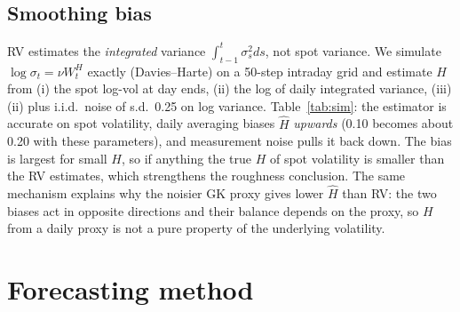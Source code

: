 \documentclass[11pt,a4paper]{article}
\begin{document}
\begin{table}[h]
\centering\footnotesize
\begin{minipage}{0.42\textwidth}\centering

\label{tab:gauss}
\end{minipage}\hfill
\begin{minipage}{0.55\textwidth}\centering

\label{tab:sim}
\end{minipage}
\end{table}

\subsection{Smoothing bias}
RV estimates the \emph{integrated} variance $\int_{t-1}^t\sigma_s^2ds$, not spot variance. We simulate
$\log\sigma_t=\nu W^H_t$ exactly (Davies--Harte) on a 50-step intraday grid and estimate $H$ from (i) the spot
log-vol at day ends, (ii) the log of daily integrated variance, (iii) (ii) plus i.i.d.\ noise of s.d.\ 0.25
on log variance. Table~\ref{tab:sim}: the estimator is accurate on spot volatility, daily averaging
biases $\hat H$ \emph{upwards} (0.10 becomes about 0.20 with these parameters), and measurement noise
pulls it back down. The bias is largest for small $H$, so if anything the true $H$ of spot volatility is
smaller than the RV estimates, which strengthens the roughness conclusion. The same mechanism explains
why the noisier GK proxy gives lower $\hat H$ than RV: the two biases act in opposite directions and their
balance depends on the proxy, so $H$ from a daily proxy is not a pure property of the underlying
volatility.

\section{Forecasting method}
\end{document}
